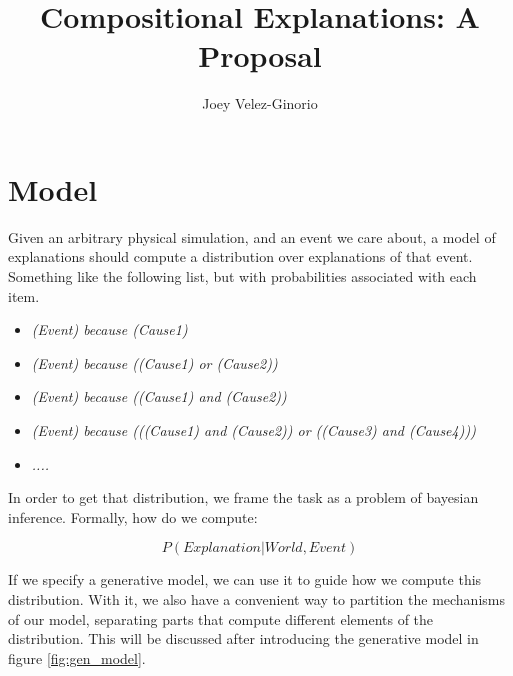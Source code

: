 \documentclass[11pt,a4paper]{article}
\begin{document}
\title{Compositional Explanations: A Proposal}
\author{Joey Velez-Ginorio}
\maketitle




\section{Model}

Given an arbitrary physical simulation, and an event we care about, a model of explanations should compute a distribution over explanations of that event. Something like the following list, but with probabilities associated with each item.

\begin{itemize}
	\item \textit{(Event) because (Cause1)}
	\item \textit{(Event) because ((Cause1) or (Cause2))}
	\item \textit{(Event) because ((Cause1) and (Cause2))}
	\item \textit{(Event) because (((Cause1) and (Cause2)) or ((Cause3) and (Cause4)))}
	\item \textit{....}
\end{itemize}


In order to get that distribution, we frame the task as a problem of bayesian inference. Formally, how do we compute:

\begin{equation}
P(Explanation|World, Event)  
\end{equation}

If we specify a generative model, we can use it to guide how we compute this distribution. With it, we also have a convenient way to partition the mechanisms of our model, separating parts that compute different elements of the distribution. This will be discussed after introducing the generative model in figure \ref{fig:gen_model}.
\end{document}
